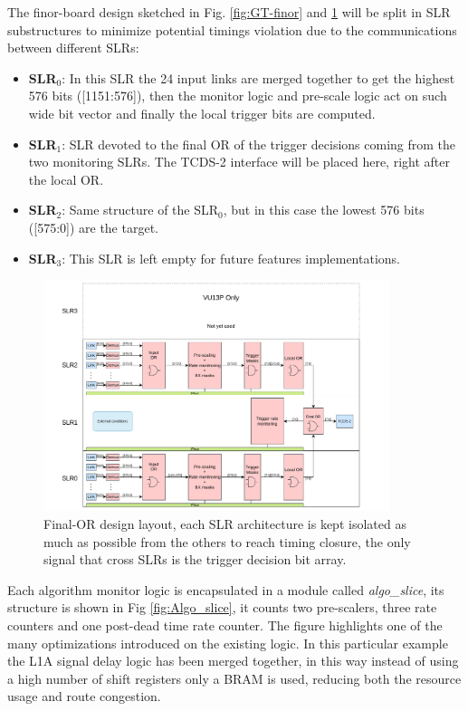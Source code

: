 \documentclass[../../main.tex]{subfiles}
\begin{document}
The finor-board design sketched in Fig. \ref{fig:GT-finor} and \ref{fig:Finor_struct}  will be split in SLR substructures to minimize potential timings violation due to the communications between different SLRs:
\begin{itemize}
    \item \textbf{SLR$_0$}: In this SLR the 24 input links are merged together to get the highest 576 bits ([1151:576]), then the monitor logic and pre-scale logic act on such wide bit vector and finally the local trigger bits are computed.
    \item \textbf{SLR$_1$}: SLR devoted to the final OR of the trigger decisions coming from the two monitoring SLRs. The TCDS-2 interface will be placed here, right after the local OR. 
    \item \textbf{SLR$_2$}: Same structure of the SLR$_0$, but in this case the lowest 576 bits ([575:0]) are the target.
    \item \textbf{SLR$_3$}: This SLR is left empty for future features implementations. 
\end{itemize}

\begin{figure}[h]
    \centering
    \includegraphics[width=0.9\textwidth]{sections/06/Images/SLRS_layout.pdf}
    \caption{Final-OR design layout, each SLR architecture is kept isolated as much as possible from the others to reach timing closure, the only signal that cross SLRs is the trigger decision bit array.}
    \label{fig:Finor_struct}
\end{figure}

Each algorithm monitor logic is encapsulated in a module called \textit{algo\_slice}, its structure is shown in Fig \ref{fig:Algo_slice}, it counts two pre-scalers, three rate counters and one post-dead time rate counter. The figure highlights one of the many optimizations introduced on the existing logic. In this particular example the L1A signal delay logic has been merged together, in this way instead of using a high number of shift registers only a BRAM is used, reducing both the resource usage and route congestion.
\end{document}
